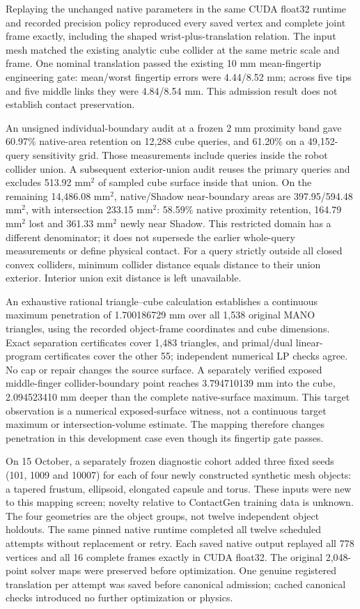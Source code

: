 \documentclass[10pt,letterpaper]{article}
\begin{document}
Replaying the unchanged native parameters in the same CUDA float32 runtime and
recorded precision policy reproduced every saved vertex and complete joint
frame exactly, including the shaped wrist-plus-translation relation. The input
mesh matched the existing analytic cube collider at the same metric scale and
frame. One nominal translation passed the existing 10 mm mean-fingertip
engineering gate: mean/worst fingertip errors were 4.44/8.52 mm; across five tips
and five middle links they were 4.84/8.54 mm. This admission result does not
establish contact preservation.

An unsigned individual-boundary audit at a frozen 2 mm proximity band gave
60.97\% native-area retention on 12,288 cube queries, and 61.20\% on a
49,152-query sensitivity grid. Those measurements include queries inside the
robot collider union. A subsequent exterior-union audit reuses the primary
queries and excludes 513.92 $\mathrm{mm}^2$ of sampled cube surface inside that
union. On the remaining 14,486.08 $\mathrm{mm}^2$, native/Shadow near-boundary
areas are 397.95/594.48 $\mathrm{mm}^2$, with intersection 233.15
$\mathrm{mm}^2$: 58.59\% native proximity retention, 164.79 $\mathrm{mm}^2$
lost and 361.33 $\mathrm{mm}^2$ newly near Shadow. This restricted domain
has a different denominator; it does not supersede the earlier whole-query
measurements or define physical contact. For a query strictly outside all
closed convex colliders, minimum collider distance equals distance to their
union exterior. Interior union exit distance is left unavailable.

An exhaustive rational triangle--cube calculation establishes a continuous
maximum penetration of 1.700186729 mm over all 1,538 original MANO triangles,
using the recorded object-frame coordinates and cube dimensions. Exact
separation certificates cover 1,483 triangles, and primal/dual linear-program
certificates cover the other 55; independent numerical LP checks agree.
No cap or repair changes the source surface. A separately verified exposed
middle-finger collider-boundary point reaches 3.794710139 mm into the cube,
2.094523410 mm deeper than the complete native-surface maximum. This target
observation is a numerical exposed-surface witness, not a continuous target
maximum or intersection-volume estimate. The mapping therefore changes
penetration in this development case even though its fingertip gate passes.

On 15 October, a separately frozen diagnostic cohort added three fixed seeds
(101, 1009 and 10007) for each of four newly constructed synthetic mesh objects:
a tapered frustum, ellipsoid, elongated capsule and torus. These inputs were new
to this mapping screen; novelty relative to ContactGen training data is unknown.
The four geometries are the object groups, not twelve independent object
holdouts. The same pinned native runtime completed all twelve scheduled
attempts without replacement or retry. Each saved native output replayed all
778 vertices and all 16 complete frames exactly in CUDA float32. The original
2,048-point solver maps were preserved before optimization. One genuine
registered translation per attempt was saved before canonical admission;
cached canonical checks introduced no further optimization or physics.
\end{document}
